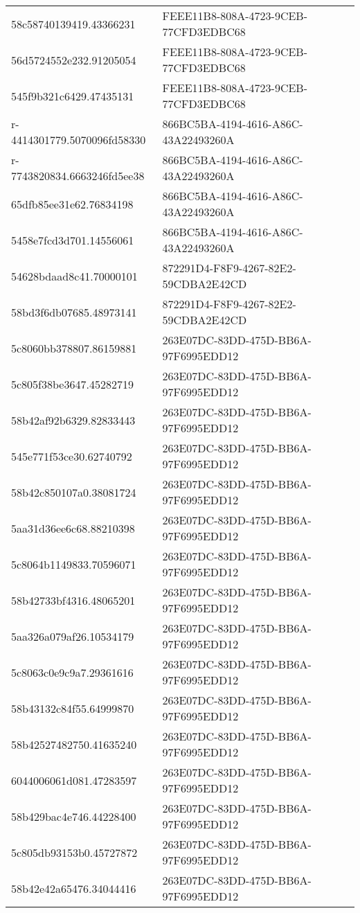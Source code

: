 \begin{tabular}{ll}
58c58740139419.43366231 & FEEE11B8-808A-4723-9CEB-77CFD3EDBC68 \\
56d5724552e232.91205054 & FEEE11B8-808A-4723-9CEB-77CFD3EDBC68 \\
545f9b321c6429.47435131 & FEEE11B8-808A-4723-9CEB-77CFD3EDBC68 \\
r-4414301779.5070096fd58330 & 866BC5BA-4194-4616-A86C-43A22493260A \\
r-7743820834.6663246fd5ee38 & 866BC5BA-4194-4616-A86C-43A22493260A \\
65dfb85ee31e62.76834198 & 866BC5BA-4194-4616-A86C-43A22493260A \\
5458e7fcd3d701.14556061 & 866BC5BA-4194-4616-A86C-43A22493260A \\
54628bdaad8c41.70000101 & 872291D4-F8F9-4267-82E2-59CDBA2E42CD \\
58bd3f6db07685.48973141 & 872291D4-F8F9-4267-82E2-59CDBA2E42CD \\
5c8060bb378807.86159881 & 263E07DC-83DD-475D-BB6A-97F6995EDD12 \\
5c805f38be3647.45282719 & 263E07DC-83DD-475D-BB6A-97F6995EDD12 \\
58b42af92b6329.82833443 & 263E07DC-83DD-475D-BB6A-97F6995EDD12 \\
545e771f53ce30.62740792 & 263E07DC-83DD-475D-BB6A-97F6995EDD12 \\
58b42c850107a0.38081724 & 263E07DC-83DD-475D-BB6A-97F6995EDD12 \\
5aa31d36ee6c68.88210398 & 263E07DC-83DD-475D-BB6A-97F6995EDD12 \\
5c8064b1149833.70596071 & 263E07DC-83DD-475D-BB6A-97F6995EDD12 \\
58b42733bf4316.48065201 & 263E07DC-83DD-475D-BB6A-97F6995EDD12 \\
5aa326a079af26.10534179 & 263E07DC-83DD-475D-BB6A-97F6995EDD12 \\
5c8063c0e9c9a7.29361616 & 263E07DC-83DD-475D-BB6A-97F6995EDD12 \\
58b43132c84f55.64999870 & 263E07DC-83DD-475D-BB6A-97F6995EDD12 \\
58b42527482750.41635240 & 263E07DC-83DD-475D-BB6A-97F6995EDD12 \\
6044006061d081.47283597 & 263E07DC-83DD-475D-BB6A-97F6995EDD12 \\
58b429bac4e746.44228400 & 263E07DC-83DD-475D-BB6A-97F6995EDD12 \\
5c805db93153b0.45727872 & 263E07DC-83DD-475D-BB6A-97F6995EDD12 \\
58b42e42a65476.34044416 & 263E07DC-83DD-475D-BB6A-97F6995EDD12 \\

\end{tabular}
